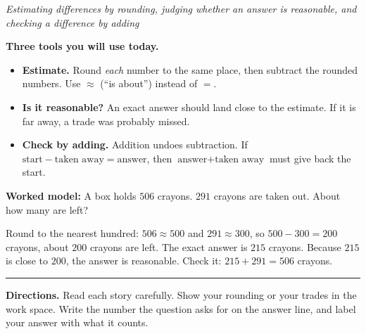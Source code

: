 \documentclass[12pt]{article}
\begin{document}

\begin{center}\small\textit{Estimating differences by rounding, judging whether an
answer is reasonable, and checking a difference by adding}\end{center}

\noindent\textbf{Three tools you will use today.}
\begin{itemize}[leftmargin=0.9cm, itemsep=2pt, topsep=3pt]
  \item \textbf{Estimate.} Round \emph{each} number to the same place, then
        subtract the rounded numbers. Use $\approx$ (``is about'') instead of $=$.
  \item \textbf{Is it reasonable?} An exact answer should land close to the
        estimate. If it is far away, a trade was probably missed.
  \item \textbf{Check by adding.} Addition undoes subtraction. If
        $\text{start} - \text{taken away} = \text{answer}$, then
        $\text{answer} + \text{taken away}$ must give back the start.
\end{itemize}

\smallskip
\noindent\textbf{Worked model:} \quad A box holds $506$ crayons. $291$ crayons are
taken out. About how many are left?
\par
Round to the nearest hundred: $506 \approx 500$ and $291 \approx 300$, so
$500 - 300 = 200$ crayons, about $200$ crayons are left. The exact answer is
$215$ crayons. Because $215$ is close to $200$, the answer is reasonable. Check
it: $215 + 291 = 506$ crayons.

\smallskip
\noindent\rule{\linewidth}{0.4pt}
\smallskip

\noindent\textbf{Directions.} Read each story carefully. Show your rounding or
your trades in the work space. Write the number the question asks for on the
answer line, and label your answer with what it counts.


\end{document}
